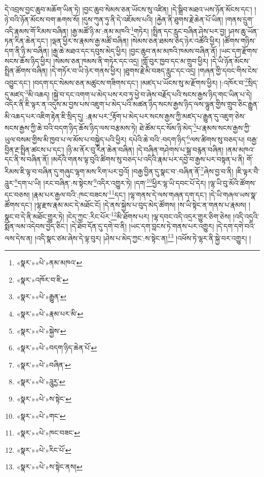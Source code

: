 དེ་འབྲས་བྱང་ཆུབ་མཆོག་ཡིན་ཏེ། །བྱང་ཆུབ་སེམས་ཅན་ཡོངས་སུ་འཛིན། །དེ་སྒྲིབ་མཐའ་ཡས་ཉོན་མོངས་དང་། །ཉེ་བའི་ཉོན་མོངས་བག་ཆགས་སོ། །དུས་ཀུན་ཏུ་ནི་དེ་འཇོམས་པའི། །རྐྱེན་ནི་ཐུགས་རྗེ་ཆེན་པོ་ཡིན། །གནས་དྲུག་འདི་རྣམས་གོ་རིམས་བཞིན། །རྒྱ་མཚོ་ཉི་མ་:ནམ་མཁའི་\footnote{«སྣར་»«པེ་»ནམ་མཁའ་}གཏེར། །སྤྲིན་དང་རླུང་བཞིན་ཤེས་པར་བྱ། །ཤས་ཆུ་ཡོན་ཏན་རིན་ཆེན་དང་། །ལྡན་ཕྱིར་ས་རྣམས་རྒྱ་མཚོ་བཞིན། །སེམས་ཅན་ཐམས་ཅད་ཉེར་འཚོའི་ཕྱིར། །ཚོགས་གཉིས་དག་ནི་ཉི་མ་བཞིན། །རྒྱ་ཆེ་མཐའ་དང་དབུས་མེད་ཕྱིར། །བྱང་ཆུབ་ནམ་མཁའི་ཁམས་བཞིན་ནོ། །ཡང་དག་རྫོགས་སངས་ཆོས་ཉིད་ཕྱིར། །སེམས་ཅན་ཁམས་ནི་གཏེར་དང་འདྲ། །གློ་བུར་ཁྱབ་དང་མ་གྲུབ་ཕྱིར། །དེ་ཡི་ཉོན་མོངས་སྤྲིན་ཚོགས་བཞིན། །དེ་གཏོར་བ་ཡི་ཉེར་གནས་ཕྱིར། །ཐུགས་རྗེ་མི་བཟད་རླུང་དང་འདྲ། །གཞན་གྱི་དབང་གིས་ངེས་འབྱུང་དང་། །བདག་དང་སེམས་ཅན་མཚུངས་གཟིགས་དང་། །མཛད་པ་ཡོངས་སུ་མ་རྫོགས་ཕྱིར། །:འཁོར་བ་\footnote{«སྣར་»འཁོར་བ་ཇི་}སྲིད་དུ་མཛད་\footnote{«སྣར་»«པེ་»རྒྱུན་}མི་འཆད། །སྐྱེ་བ་དང་འགག་པ་མེད་པས་རབ་ཏུ་ཕྱེ་བ་ཞེས་བརྗོད་པའི་སངས་རྒྱས་ཉིད་གང་ཡིན་པ་དེ། འདིར་ནི་ཇི་ལྟར་ན་འདུས་མ་བྱས་པས་འཇུག་པ་མེད་པའི་མཚན་ཉིད་སངས་རྒྱས་ཉིད་ལས་ལྷུན་གྱིས་གྲུབ་ཅིང་རྒྱུན་མི་འཆད་པར་འཇིག་རྟེན་ཇི་སྲིད་དུ། :རྣམ་པར་\footnote{«སྣར་»«པེ་»རྣམ་པར་མི་}རྟོག་པ་མེད་པར་སངས་རྒྱས་ཀྱི་མཛད་པ་རྒྱུན་དུ་འཇུག་ཅེས་སངས་རྒྱས་ཀྱི་ཆེ་བའི་བདག་ཉིད་ཆོས་ཉིད་ལས་བརྩམས་ཏེ། ཐེ་ཚོམ་དང་སོམ་ཉི་མེད་\footnote{«སྣར་»«པེ་»སྐྱེས་}པ་རྣམས་སངས་རྒྱས་ཀྱི་ཡུལ་བསམ་གྱིས་མི་ཁྱབ་པ་ལ་མོས་པ་བསྐྱེད་པའི་ཕྱིར། དཔེའི་ཆེ་བའི་:བདག་ཉིད་\footnote{«སྣར་»«པེ་»བདག་ཉིད་ཆེན་པོ་}ལས་ཚིགས་སུ་བཅད་པ། བརྒྱ་བྱིན་རྔ་སྤྲིན་ཚངས་པ་དང་། །ཉི་མ་ནོར་བུ་རིན་ཆེན་བཞིན། །དེ་བཞིན་གཤེགས་པ་སྒྲ་བརྙན་བཞིན། །ནམ་མཁའ་དང་ནི་ས་བཞིན་ནོ། །མདོའི་གནས་ལྟ་བུའི་ཚིགས་སུ་བཅད་པ་འདིའི་རྣམ་པར་དབྱེ་བ་རྒྱས་པར་བསྟན་པ་ནི། གོ་རིམས་ཇི་ལྟ་བ་བཞིན་དུ་གཞུང་ལྷག་མས་རིག་པར་བྱའོ། །བརྒྱ་བྱིན་དུ་སྣང་བ་:བཞིན་ནོ་\footnote{«སྣར་»«པེ་»བཞིན་}ཞེས་བྱ་བ་ནི། །ཇི་ལྟར་བཻ་ཌཱུར་\footnote{«སྣར་»«པེ་»ཌཱུརྱ་}དག་པ་ཡི། །རང་བཞིན་:ས་སྟེངས་\footnote{«སྣར་»«པེ་»ས་སྟེང་}འདིར་འགྱུར་ཏེ། །དག་\footnote{«སྣར་»«པེ་»གང་}ཕྱིར་ལྷ་ཡི་དབང་པོ་དེར། །ལྷ་ཡི་བུ་མོའི་ཚོགས་དང་བཅས། །རྣམ་པར་རྒྱལ་བའི་:ཁང་བཟངས་\footnote{«སྣར་»«པེ་»ཁང་བཟང་}དང་། །ལྷ་གནས་དེ་ལས་གཞན་དག་དང་། །དེ་ཡི་གཞལ་ཡས་སྣ་ཚོགས་དང་། །ལྷ་རྫས་རྣམ་མང་དེ་མཐོང་ངོ། །དེ་ནས་སྐྱེས་པ་བུད་མེད་ཚོགས། །ས་ཡི་སྟེང་ན་གནས་པ་རྣམས། །སྣང་བ་དེ་ནི་མཐོང་གྱུར་ཏེ། །ངེད་ཀྱང་:རིང་པོར་\footnote{«སྣར་»«པེ་»རིང་པོ་}མི་ཐོགས་པར། །ལྷ་དབང་འདི་འདྲར་གྱུར་ཅིག་ཅེས། །འདི་འདྲའི་སྨོན་ལམ་འདེབས་བྱེད་ཅིང་། །དེ་ཐོབ་དོན་དུ་དགེ་བ་ནི། །ཡང་དག་བླངས་ཏེ་གནས་པར་འགྱུར། །དེ་དག་དགེ་བའི་ལས་དེས་ན། །འདི་སྣང་ཙམ་ཞེས་དེ་ལྟ་བུར། །ཤེས་པ་མེད་ཀྱང་:ས་སྟེང་ན།\footnote{«སྣར་»«པེ་»ས་སྟེང་ནས།} །འཕོས་ཏེ་ལྷར་ནི་སྐྱེ་བར་འགྱུར། །
